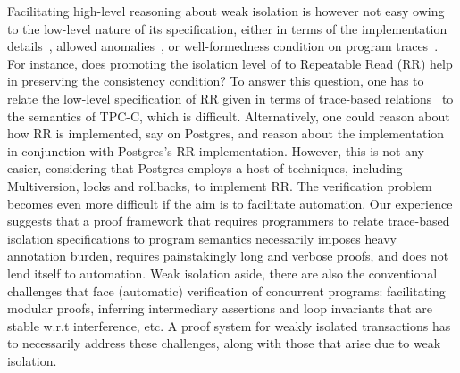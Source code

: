 Facilitating high-level reasoning about weak isolation is however not
easy owing to the low-level nature of its specification, either in
terms of the implementation details~\cite{gray}, allowed
anomalies~\cite{berenson}, or well-formedness condition on program
traces~\cite{adyaphd,gotsmanconcur15}. For instance, does promoting
the isolation level of  to Repeatable Read (RR) help in
preserving the consistency condition? To answer this question, one has
to relate the low-level specification of RR given in terms of
trace-based relations~\cite{adyaphd,gotsmanconcur15} to the semantics
of TPC-C, which is difficult. Alternatively, one could reason about
how RR is implemented, say on Postgres, and reason about the
 implementation in conjunction with Postgres's RR
implementation. However, this is not any easier, considering that
Postgres employs a host of techniques, including Multiversion, locks
and rollbacks, to implement RR. The verification problem becomes even
more difficult if the aim is to facilitate automation. Our experience
suggests that a proof framework that requires programmers to relate
trace-based isolation specifications to program semantics necessarily
imposes heavy annotation burden, requires painstakingly long and
verbose proofs, and does not lend itself to automation. Weak isolation
aside, there are also the conventional challenges that face
(automatic) verification of concurrent programs: facilitating modular
proofs, inferring intermediary assertions and loop invariants that are
stable w.r.t interference, etc. A proof system for weakly isolated
transactions has to necessarily address these challenges, along with
those that arise due to weak isolation.

